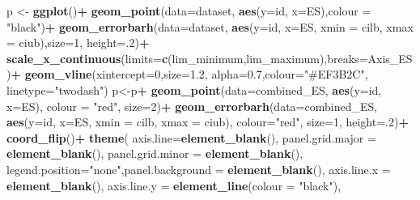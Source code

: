 \documentclass[
]{book}
\newenvironment{Shaded}{\begin{snugshade}}{\end{snugshade}}
\newcommand{\AttributeTok}[1]{\textcolor[rgb]{0.13,0.29,0.53}{#1}}
\newcommand{\DecValTok}[1]{\textcolor[rgb]{0.00,0.00,0.81}{#1}}
\newcommand{\FloatTok}[1]{\textcolor[rgb]{0.00,0.00,0.81}{#1}}
\newcommand{\FunctionTok}[1]{\textcolor[rgb]{0.13,0.29,0.53}{\textbf{#1}}}
\newcommand{\NormalTok}[1]{#1}
\newcommand{\OtherTok}[1]{\textcolor[rgb]{0.56,0.35,0.01}{#1}}
\newcommand{\SpecialCharTok}[1]{\textcolor[rgb]{0.81,0.36,0.00}{\textbf{#1}}}
\newcommand{\StringTok}[1]{\textcolor[rgb]{0.31,0.60,0.02}{#1}}
\begin{document}
\begin{Shaded}
\begin{Highlighting}[]
\NormalTok{p }\OtherTok{\textless{}{-}} \FunctionTok{ggplot}\NormalTok{()}\SpecialCharTok{+}
  \FunctionTok{geom\_point}\NormalTok{(}\AttributeTok{data=}\NormalTok{dataset, }\FunctionTok{aes}\NormalTok{(}\AttributeTok{y=}\NormalTok{id, }\AttributeTok{x=}\NormalTok{ES),}\AttributeTok{colour =} \StringTok{"black"}\NormalTok{)}\SpecialCharTok{+}
  \FunctionTok{geom\_errorbarh}\NormalTok{(}\AttributeTok{data=}\NormalTok{dataset, }\FunctionTok{aes}\NormalTok{(}\AttributeTok{y=}\NormalTok{id, }\AttributeTok{x=}\NormalTok{ES, }\AttributeTok{xmin =}\NormalTok{ cilb, }\AttributeTok{xmax =}\NormalTok{ ciub),}\AttributeTok{size=}\DecValTok{1}\NormalTok{,  }\AttributeTok{height=}\NormalTok{.}\DecValTok{2}\NormalTok{)}\SpecialCharTok{+}
  \FunctionTok{scale\_x\_continuous}\NormalTok{(}\AttributeTok{limits=}\FunctionTok{c}\NormalTok{(lim\_minimum,lim\_maximum),}\AttributeTok{breaks=}\NormalTok{Axis\_ES)}\SpecialCharTok{+} 
  \FunctionTok{geom\_vline}\NormalTok{(}\AttributeTok{xintercept=}\DecValTok{0}\NormalTok{,}\AttributeTok{size=}\FloatTok{1.2}\NormalTok{, }\AttributeTok{alpha=}\FloatTok{0.7}\NormalTok{,}\AttributeTok{colour=}\StringTok{"\#EF3B2C"}\NormalTok{, }\AttributeTok{linetype=}\StringTok{"twodash"}\NormalTok{)}
\NormalTok{p}\OtherTok{\textless{}{-}}\NormalTok{p}\SpecialCharTok{+}
  \FunctionTok{geom\_point}\NormalTok{(}\AttributeTok{data=}\NormalTok{combined\_ES, }\FunctionTok{aes}\NormalTok{(}\AttributeTok{y=}\NormalTok{id, }\AttributeTok{x=}\NormalTok{ES), }\AttributeTok{colour =} \StringTok{"red"}\NormalTok{, }\AttributeTok{size=}\DecValTok{2}\NormalTok{)}\SpecialCharTok{+}
  \FunctionTok{geom\_errorbarh}\NormalTok{(}\AttributeTok{data=}\NormalTok{combined\_ES, }\FunctionTok{aes}\NormalTok{(}\AttributeTok{y=}\NormalTok{id, }\AttributeTok{x=}\NormalTok{ES, }\AttributeTok{xmin =}\NormalTok{ cilb, }\AttributeTok{xmax =}\NormalTok{ ciub), }\AttributeTok{colour=}\StringTok{"red"}\NormalTok{, }\AttributeTok{size=}\DecValTok{1}\NormalTok{,  }\AttributeTok{height=}\NormalTok{.}\DecValTok{2}\NormalTok{)}\SpecialCharTok{+}
  \FunctionTok{coord\_flip}\NormalTok{()}\SpecialCharTok{+}
  \FunctionTok{theme}\NormalTok{( }\AttributeTok{axis.line=}\FunctionTok{element\_blank}\NormalTok{(), }\AttributeTok{panel.grid.major =} \FunctionTok{element\_blank}\NormalTok{(), }\AttributeTok{panel.grid.minor =} \FunctionTok{element\_blank}\NormalTok{(),}
         \AttributeTok{legend.position=}\StringTok{"none"}\NormalTok{,}\AttributeTok{panel.background =} \FunctionTok{element\_blank}\NormalTok{(), }\AttributeTok{axis.line.x =} \FunctionTok{element\_blank}\NormalTok{(), }\AttributeTok{axis.line.y =} \FunctionTok{element\_line}\NormalTok{(}\AttributeTok{colour =} \StringTok{"black"}\NormalTok{),}

\end{Highlighting}
\end{Shaded}
\end{document}
